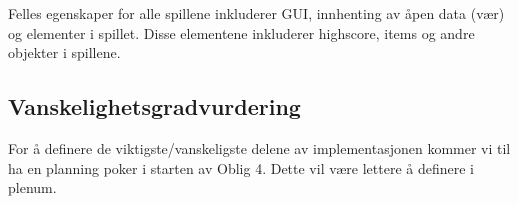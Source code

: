 \documentclass[12pt]{report}
\begin{document}
Felles egenskaper for alle spillene inkluderer GUI, 
innhenting av {\aa}pen data (v{\ae}r) og elementer i spillet.
Disse elementene inkluderer highscore, items og andre objekter i spillene.

\subsection*{Vanskelighetsgradvurdering}

For {\aa} definere de viktigste/vanskeligste delene av implementasjonen
kommer vi til ha en planning poker i starten av Oblig 4.
Dette vil v{\ae}re lettere {\aa} definere i plenum.
\end{document}
